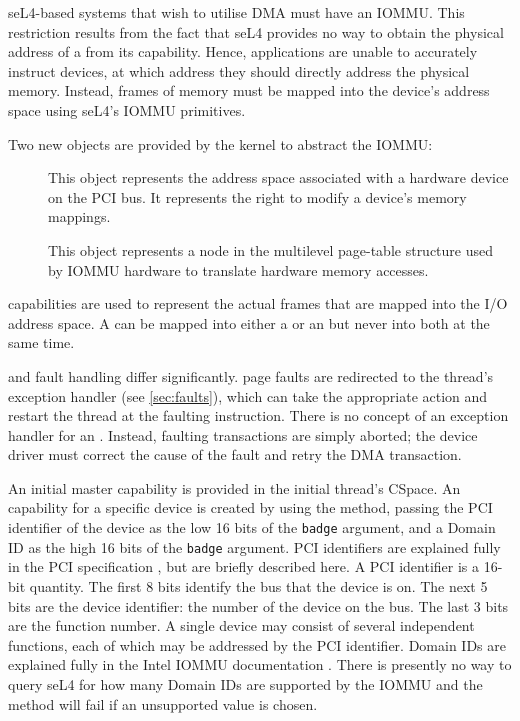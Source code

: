 seL4-based systems that wish to utilise DMA must have an IOMMU.
This restriction results from the fact that seL4 provides no way to obtain the physical address of a  from its capability.
Hence, applications are unable to accurately instruct devices,
at which address they should directly address the physical memory.
Instead, frames of memory must be mapped into the device's address space using seL4's IOMMU primitives.

Two new objects are provided by the kernel to abstract the IOMMU:
\begin{description}

    \item[] This object represents the address space associated
    with a hardware device on the PCI bus. It represents the right to
    modify a device's memory mappings.

    \item[] This object represents a node in the multilevel
    page-table structure used by IOMMU hardware to translate hardware
    memory accesses.

\end{description}

 capabilities are used to represent the actual frames that are
mapped into the I/O address space. A  can be mapped into
either a  or an  but never into both at the same time.

 and  fault handling differ significantly.
 page faults are redirected to the thread's exception handler (see \autoref{sec:faults}), 
which can take the
appropriate action and restart the thread at the faulting instruction.
There is no concept of an exception handler for an . Instead, faulting
transactions are simply
aborted; the device driver must correct the cause of the fault and retry
the DMA transaction.

An initial master  capability is provided in the initial thread's
CSpace. An  capability for a specific device is created by
using the  method, passing the
PCI identifier of the device as the low 16 bits of the \texttt{badge} argument, and
a Domain ID as the high 16 bits of the \texttt{badge} argument.
PCI identifiers are explained fully in the PCI specification 
\cite{Shanley:PCISA}, but are briefly described here. A PCI identifier is
a 16-bit quantity.  The first 8 bits identify the bus that the device is on.
The next 5 bits are the device identifier: the number of the device on
the bus. The last 3 bits are the function number. A single device may
consist of several independent functions, each of which may be addressed
by the PCI identifier.
Domain IDs are explained fully in the Intel IOMMU documentation \cite{extra:vtd}.
There is presently no way to query seL4 for how many Domain IDs are supported by
the IOMMU and the  method will fail if an
unsupported value is chosen.

